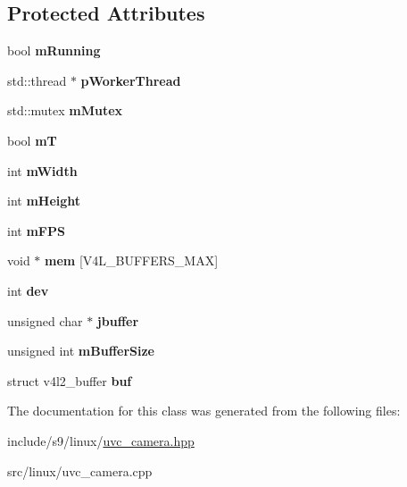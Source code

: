 \subsection*{Protected Attributes}
\begin{DoxyCompactItemize}
\item 
\hypertarget{classUVCVideo_ad524ce09da0c9535532e434dd2fc50c0}{bool {\bfseries m\-Running}}\label{classUVCVideo_ad524ce09da0c9535532e434dd2fc50c0}

\item 
\hypertarget{classUVCVideo_a93dc13b7b27761573d532cc029f4bd64}{std\-::thread $\ast$ {\bfseries p\-Worker\-Thread}}\label{classUVCVideo_a93dc13b7b27761573d532cc029f4bd64}

\item 
\hypertarget{classUVCVideo_afc64962ab969a9133fb8a5dbfdc79bdf}{std\-::mutex {\bfseries m\-Mutex}}\label{classUVCVideo_afc64962ab969a9133fb8a5dbfdc79bdf}

\item 
\hypertarget{classUVCVideo_a853fe33ca98c6c59a74d6cf4dc72a08a}{bool {\bfseries m\-T}}\label{classUVCVideo_a853fe33ca98c6c59a74d6cf4dc72a08a}

\item 
\hypertarget{classUVCVideo_a098edf84331b4c9dd247baf6749d1aff}{int {\bfseries m\-Width}}\label{classUVCVideo_a098edf84331b4c9dd247baf6749d1aff}

\item 
\hypertarget{classUVCVideo_ac3187fdb8d3322017a522858024017f4}{int {\bfseries m\-Height}}\label{classUVCVideo_ac3187fdb8d3322017a522858024017f4}

\item 
\hypertarget{classUVCVideo_a579fe74a5b15f275c4606a3c6e113162}{int {\bfseries m\-F\-P\-S}}\label{classUVCVideo_a579fe74a5b15f275c4606a3c6e113162}

\item 
\hypertarget{classUVCVideo_a6e84e9ee7772d92ec8e3e0150a388479}{void $\ast$ {\bfseries mem} \mbox{[}V4\-L\-\_\-\-B\-U\-F\-F\-E\-R\-S\-\_\-\-M\-A\-X\mbox{]}}\label{classUVCVideo_a6e84e9ee7772d92ec8e3e0150a388479}

\item 
\hypertarget{classUVCVideo_ad544fe02b22856ef4399d6859d7bce71}{int {\bfseries dev}}\label{classUVCVideo_ad544fe02b22856ef4399d6859d7bce71}

\item 
\hypertarget{classUVCVideo_a22f39add74dc8e050d2948ff4ab7b739}{unsigned char $\ast$ {\bfseries jbuffer}}\label{classUVCVideo_a22f39add74dc8e050d2948ff4ab7b739}

\item 
\hypertarget{classUVCVideo_a8cf2021f56cfb281e19de3be1b89811f}{unsigned int {\bfseries m\-Buffer\-Size}}\label{classUVCVideo_a8cf2021f56cfb281e19de3be1b89811f}

\item 
\hypertarget{classUVCVideo_a2f457a139e815b1c49c51c0b92e6edca}{struct v4l2\-\_\-buffer {\bfseries buf}}\label{classUVCVideo_a2f457a139e815b1c49c51c0b92e6edca}

\end{DoxyCompactItemize}


The documentation for this class was generated from the following files\-:\begin{DoxyCompactItemize}
\item 
include/s9/linux/\hyperlink{uvc__camera_8hpp}{uvc\-\_\-camera.\-hpp}\item 
src/linux/uvc\-\_\-camera.\-cpp\end{DoxyCompactItemize}
